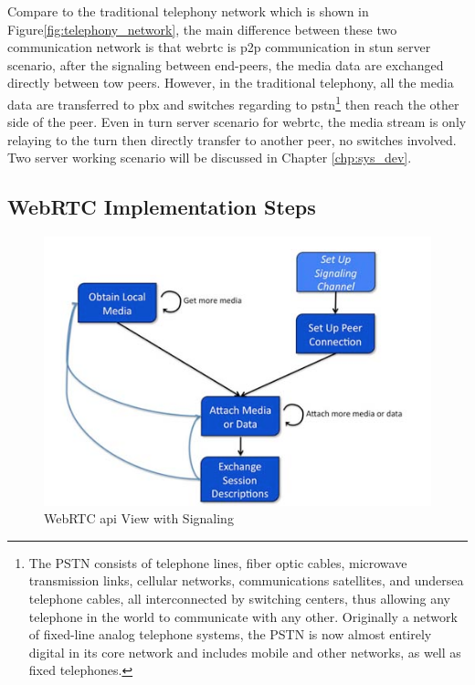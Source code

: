 \par Compare to the traditional telephony network which is shown in Figure\ref{fig:telephony_network}\cite{web:teleVSvoip}, the main difference between these two communication network is that \gls{webrtc} is \gls{p2p} communication in \gls{stun} server scenario, after the signaling between end-peers, the media data are exchanged directly between tow peers. However, in the traditional telephony, all the media data are transferred to \gls{pbx} and switches regarding to \gls{pstn}\footnote{The PSTN consists of telephone lines, fiber optic cables, microwave transmission links, cellular networks, communications satellites, and undersea telephone cables, all interconnected by switching centers, thus allowing any telephone in the world to communicate with any other. Originally a network of fixed-line analog telephone systems, the PSTN is now almost entirely digital in its core network and includes mobile and other networks, as well as fixed telephones.\cite{wiki:pstn}} then reach the other side of the peer. Even in \gls{turn} server scenario for \gls{webrtc}, the media stream is only relaying to the \gls{turn} then directly transfer to another peer, no switches involved. Two server working scenario will be discussed in Chapter \ref{chp:sys_dev}.

\subsection{WebRTC Implementation Steps}

\begin{figure}
	\centering
    	\includegraphics[width=0.50\textheight,natwidth=610,natheight=642]{figs/webrtcApis.png}
  	\caption{WebRTC \gls{api} View with Signaling\cite{inbook:rtc-apis}}
  	\label{fig:webrtc_4steps}
\end{figure}


